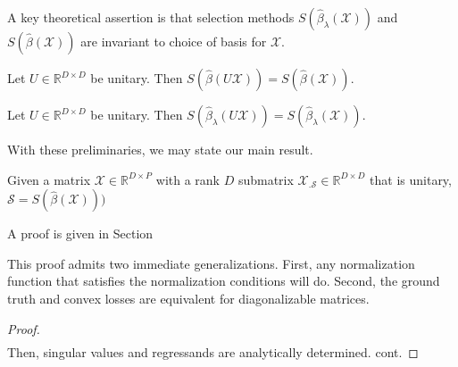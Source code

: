A key theoretical assertion is that selection methods $S(\widehat {\beta}_{\lambda} (\mathcal X))$ and $S(\widehat {\beta} (\mathcal X))$ are invariant to choice of basis for $\mathcal X$.

\begin{proposition}
\label{prop:basis_pursuit_selection_equivalence}
Let $U \in \mathbb R^{D \times D}$ be unitary.
 Then $S(\widehat \beta  (U \mathcal X)) = S(\widehat \beta (\mathcal X))$.
\end{proposition}

\begin{proposition}
\label{prop:lasso_selection_equivalence}
Let $U \in \mathbb R^{D \times D}$ be unitary.
 Then $S(\widehat \beta_{\lambda}  (U \mathcal X)) = S(\widehat \beta_{\lambda} (\mathcal X))$.
\end{proposition}


With these preliminaries, we may state our main result.

\begin{proposition}
\label{prop:unitary_selection}
Given a matrix $\mathcal X \in \mathbb R^{D \times P}$ with a rank $D$ submatrix $\mathcal X_{.\mathcal S} \in \mathbb R^{D \times D}$ that is unitary, $\mathcal S = S(\widehat{\beta} (\mathcal X)))$
 \end{proposition}
 
 A proof is given in Section 
 
This proof admits two immediate generalizations.
First, any normalization function that satisfies the normalization conditions will do.
Second, the ground truth and convex losses are equivalent for diagonalizable matrices.


\begin{proposition}
\label{prop:main}
\end{proposition}
\begin{proof}
\begin{align}
\end{align}
Then, singular values and regressands are analytically determined.  cont.
\end{proof}


